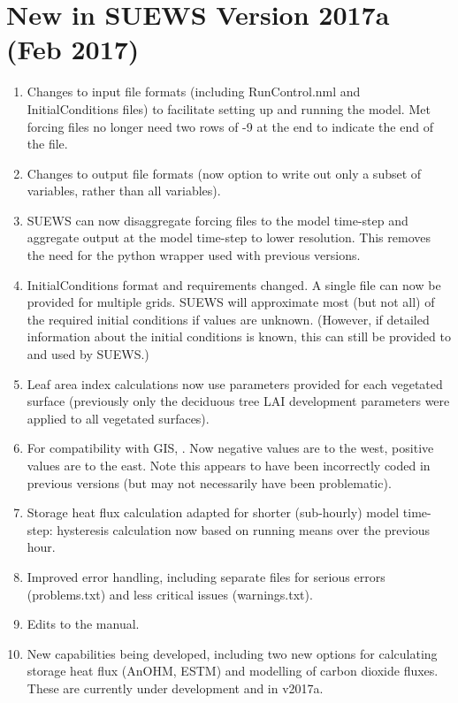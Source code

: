 \documentclass[letterpaper,10pt,english]{sphinxmanual}
\begin{document}
\section{New in SUEWS Version 2017a (Feb 2017)}
\label{\detokenize{version-history:new-in-suews-version-2017a-feb-2017}}\begin{enumerate}
\item {} 
Changes to input file formats (including RunControl.nml and
InitialConditions files) to facilitate setting up and running the
model. Met forcing files no longer need two rows of -9 at the end to
indicate the end of the file.

\item {} 
Changes to output file formats (now option to write out only a subset
of variables, rather than all variables).

\item {} 
SUEWS can now disaggregate forcing files to the model time-step and
aggregate output at the model time-step to lower resolution. This
removes the need for the python wrapper used with previous versions.

\item {} 
InitialConditions format and requirements changed. A single file can
now be provided for multiple grids. SUEWS will approximate most (but
not all) of the required initial conditions if values are unknown.
(However, if detailed information about the initial conditions is
known, this can still be provided to and used by SUEWS.)

\item {} 
Leaf area index calculations now use parameters provided for each
vegetated surface (previously only the deciduous tree LAI development
parameters were applied to all vegetated surfaces).

\item {} 
For compatibility with GIS, . Now negative values are to the west, positive values
are to the east. Note this appears to have been incorrectly coded in
previous versions (but may not necessarily have been problematic).

\item {} 
Storage heat flux calculation adapted for shorter (sub-hourly) model
time-step: hysteresis calculation now based on running means over the
previous hour.

\item {} 
Improved error handling, including separate files for serious errors
(problems.txt) and less critical issues (warnings.txt).

\item {} 
Edits to the manual.

\item {} 
New capabilities being developed, including two new options for
calculating storage heat flux (AnOHM, ESTM) and modelling of carbon
dioxide fluxes. These are currently under development and  in v2017a.

\end{enumerate}
\end{document}

